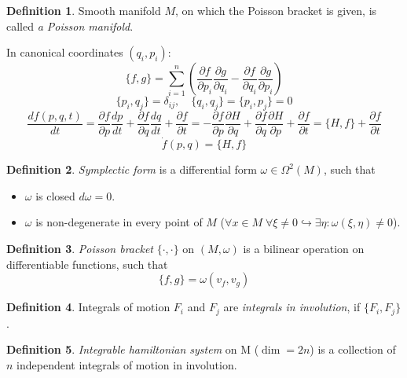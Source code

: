 \documentclass[12pt]{article}
\theoremstyle{definition}
\newtheorem{defin}{Definition}[]
\begin{document}
\begin{defin}
    Smooth manifold $M$, on which the Poisson bracket is given, is called \textit{a Poisson manifold}.
\end{defin}
In canonical coordinates $(q_i,p_i)$:
\begin{equation}
    \{f,g\}=\sum\limits_{i=1}^n\left(\frac{\partial f}{\partial p_i}\frac{\partial g}{\partial q_i}-\frac{\partial f}{\partial q_i}\frac{\partial g}{\partial p_i}\right)
\end{equation}
\begin{equation}
    \{p_i,q_j\}=\delta_{ij},\quad\{q_i,q_j\}=\{p_i,p_j\}=0
\end{equation}
\begin{equation}
    \frac{df(p,q,t)}{dt}=\frac{\partial f}{\partial p}\frac{dp}{dt}+\frac{\partial f}{\partial q}\frac{dq}{dt}+\frac{\partial f}{\partial t}=-\frac{\partial f}{\partial p}\frac{\partial H}{\partial q}+\frac{\partial f}{\partial q}\frac{\partial H}{\partial p}+\frac{\partial f}{\partial t}=\{H,f\}+\frac{\partial f}{\partial t}
\end{equation}
\begin{equation}
    \dot{f}(p,q)=\{H,f\}
\end{equation}
\begin{defin}
    \textit{Symplectic form} is a differential form $\omega\in\Omega^2(M)$, such that
    \begin{itemize}
        \item $\omega$ is closed $d\omega=0$.
        \item $\omega$ is non-degenerate in every point of $M$ ($\forall x\in M\;\forall\xi\neq0\hookrightarrow\exists\eta:\omega(\xi,\eta)\neq0$).
    \end{itemize}
\end{defin}
\begin{defin}
    \textit{Poisson bracket} $\{\bm{\cdot},\bm{\cdot}\}$ on $(M,\omega)$ is a bilinear operation on differentiable functions, such that
    \begin{equation}
        \{f,g\}=\omega(v_f,v_g)
    \end{equation}
\end{defin}
\begin{defin}
    Integrals of motion $F_i$ and $F_j$ are \textit{integrals in involution}, if $\{F_i,F_j\}$.
\end{defin}
\begin{defin}
    \textit{Integrable hamiltonian system} on M ($\dim=2n$) is a collection of $n$ independent integrals of motion in involution.
\end{defin}
\end{document}
